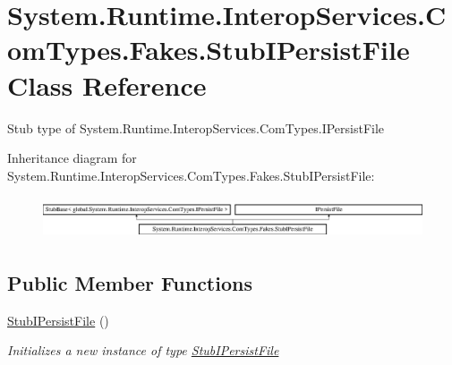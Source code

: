 \hypertarget{class_system_1_1_runtime_1_1_interop_services_1_1_com_types_1_1_fakes_1_1_stub_i_persist_file}{\section{System.\-Runtime.\-Interop\-Services.\-Com\-Types.\-Fakes.\-Stub\-I\-Persist\-File Class Reference}
\label{class_system_1_1_runtime_1_1_interop_services_1_1_com_types_1_1_fakes_1_1_stub_i_persist_file}
}


Stub type of System.\-Runtime.\-Interop\-Services.\-Com\-Types.\-I\-Persist\-File 


Inheritance diagram for System.\-Runtime.\-Interop\-Services.\-Com\-Types.\-Fakes.\-Stub\-I\-Persist\-File\-:\begin{figure}[H]
\begin{center}
\leavevmode
\includegraphics[height=1.258427cm]{class_system_1_1_runtime_1_1_interop_services_1_1_com_types_1_1_fakes_1_1_stub_i_persist_file}
\end{center}
\end{figure}
\subsection*{Public Member Functions}
\begin{DoxyCompactItemize}
\item 
\hyperlink{class_system_1_1_runtime_1_1_interop_services_1_1_com_types_1_1_fakes_1_1_stub_i_persist_file_a26e699b818a0eaa1ff7f326abc231448}{Stub\-I\-Persist\-File} ()
\begin{DoxyCompactList}\small\item\em Initializes a new instance of type \hyperlink{class_system_1_1_runtime_1_1_interop_services_1_1_com_types_1_1_fakes_1_1_stub_i_persist_file}{Stub\-I\-Persist\-File}\end{DoxyCompactList}\end{DoxyCompactItemize}
